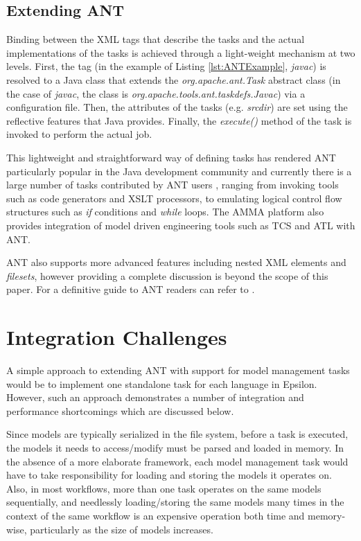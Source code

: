 \subsection{Extending ANT}

Binding between the XML tags that describe the tasks and the actual implementations of the tasks is achieved through a light-weight mechanism at two levels. First, the tag (in the example of Listing \ref{lst:ANTExample}, \emph{javac}) is resolved to a Java class that extends the \emph{org.apache.ant.Task} abstract class (in the case of \emph{javac}, the class is \emph{org.apache.tools.ant.taskdefs.Javac}) via a configuration file. Then, the attributes of the tasks (e.g. \emph{srcdir}) are set using the reflective features that Java provides. Finally, the \emph{execute()} method of the task is invoked to perform the actual job.

This lightweight and straightforward way of defining tasks has rendered ANT particularly popular in the Java development community and currently there is a large number of tasks contributed by ANT users \cite{AntExternalTasks}, ranging from invoking tools such as code generators and XSLT processors, to emulating logical control flow structures such as \emph{if} conditions and \emph{while} loops. The AMMA platform \cite{AMMA} also provides integration of model driven engineering tools such as TCS \cite{TCS} and ATL \cite{ATL} with ANT.

ANT also supports more advanced features including nested XML elements and \emph{filesets}, however providing a complete discussion is beyond the scope of this paper. For a definitive guide to ANT readers can refer to \cite{AntBook}.

\section{Integration Challenges}
\label{sec:Workflow.IntegrationChallenges}

A simple approach to extending ANT with support for model management tasks would be to implement one standalone task for each language in Epsilon. However, such an approach demonstrates a number of integration and performance shortcomings which are discussed below. 

Since models are typically serialized in the file system, before a task is executed, the models it needs to access/modify must be parsed and loaded in memory. In the absence of a more elaborate framework, each model management task would have to take responsibility for loading and storing the models it operates on. Also, in most workflows, more than one task operates on the same models sequentially, and needlessly loading/storing the same models many times in the context of the same workflow is an expensive operation both time and memory-wise, particularly as the size of models increases.

